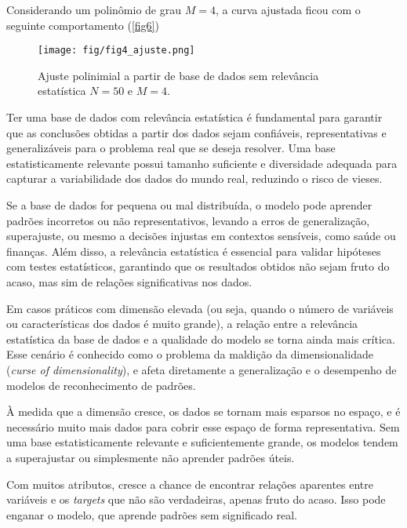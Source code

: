 \documentclass{article}
\begin{document}
\begin{itemize}
  	       Considerando um polinômio de grau $M=4$, a curva ajustada ficou com o seguinte comportamento (\autoref{fig6})
  	       
  	       \begin{figure}[ht]
  	       	\centering %
  	       	\texttt{[image: fig/fig4\_ajuste.png]} %
  	       	\caption{Ajuste polinimial  a partir de base de dados sem relevância estatística $N=50$ e $M=4$.} %
  	       	\label{fig6} %
  	       \end{figure} 
  	       
  	       Ter uma base de dados com relevância estatística é fundamental para garantir que as conclusões obtidas a partir dos dados sejam confiáveis, representativas e generalizáveis para o problema real que se deseja resolver. Uma base estatisticamente relevante possui tamanho suficiente e diversidade adequada para capturar a variabilidade dos dados do mundo real, reduzindo o risco de vieses.
  	       
  	       Se a base de dados for pequena ou mal distribuída, o modelo pode aprender padrões incorretos ou não representativos, levando a erros de generalização, superajuste, ou mesmo a decisões injustas em contextos sensíveis, como saúde ou finanças. Além disso, a relevância estatística é essencial para validar hipóteses com testes estatísticos, garantindo que os resultados obtidos não sejam fruto do acaso, mas sim de relações significativas nos dados.
  	       
  	       Em casos práticos com dimensão elevada (ou seja, quando o número de variáveis ou características dos dados é muito grande), a relação entre a relevância estatística da base de dados e a qualidade do modelo se torna ainda mais crítica. Esse cenário é conhecido como o problema da maldição da dimensionalidade (\textit{curse of dimensionality}), e afeta diretamente a generalização e o desempenho de modelos de reconhecimento de padrões.
  	       
  	       À medida que a dimensão cresce, os dados se tornam mais esparsos no espaço, e é necessário muito mais dados para cobrir esse espaço de forma representativa. Sem uma base estatisticamente relevante e suficientemente grande, os modelos tendem a superajustar ou simplesmente não aprender padrões úteis.
  	       
  	       Com muitos atributos, cresce a chance de encontrar relações aparentes entre variáveis e os \textit{targets} que não são verdadeiras, apenas fruto do acaso. Isso pode enganar o modelo, que aprende padrões sem significado real.
  	       

\end{itemize}
\end{document}
